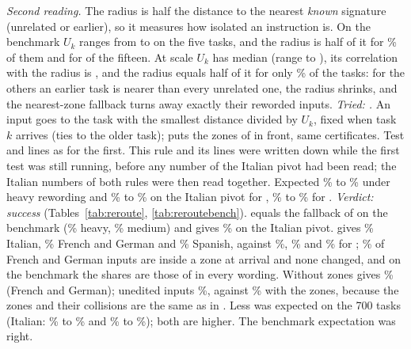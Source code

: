 \emph{Second reading.} The radius is half the distance to the nearest \emph{known} signature (unrelated or earlier), so it measures how isolated an instruction is. On the benchmark $U_k$ ranges from \RerouteBBenchFiveMin{} to \RerouteBBenchFiveMax{} on the five tasks, and the radius is half of it for \RerouteBBenchFiveShare{}\% of them and for \RerouteBBenchFifteenCount{} of the fifteen. At scale $U_k$ has median \RerouteBMedian{} (range \RerouteBMin{} to \RerouteBMax{}), its correlation with the radius is \RerouteBCorr{}, and the radius equals half of it for only \RerouteBShare{}\% of the \WidenTasksEval{} tasks: for the others an earlier task is nearer than every unrelated one, the radius shrinks, and the nearest-zone fallback turns away exactly their reworded inputs.
\emph{Tried: \scaled{}.} An input goes to the task with the smallest distance divided by $U_k$, fixed when task $k$ arrives (ties to the older task); \certscaled{} puts the zones of \cert{} in front, same certificates. Test and lines as for the first. This rule and its lines were written down while the first test was still running, before any number of the Italian pivot had been read; the Italian numbers of both rules were then read together. Expected \RerouteExpectBgHeavyLow{}\% to \RerouteExpectBgHeavyHigh{}\% under heavy rewording and \RerouteExpectBgItLow{}\% to \RerouteExpectBgItHigh{}\% on the Italian pivot for \scaled{}, \RerouteExpectCfItLow{}\% to \RerouteExpectCfItHigh{}\% for \certscaled{}.
\emph{Verdict: success} (Tables~\ref{tab:reroute}, \ref{tab:reroutebench}). \scaled{} equals the fallback of \cert{} on the benchmark (\RerouteBgHeavyFive{}\% heavy, \RerouteBgMediumFive{}\% medium) and gives \RerouteBgItOwn{}\% on the Italian pivot. \certscaled{} gives \RerouteCertFourItOwn{}\% Italian, \RerouteCertFourOwnEnd{}\% French and German and \RerouteCertFourEsOwn{}\% Spanish, against \RerouteCertItOwn{}\%, \RerouteCertOwnEnd{}\% and \RerouteCertEsOwn{}\% for \cert{}; \RerouteCertFourInZone{}\% of French and German inputs are inside a zone at arrival and none changed, and on the benchmark the shares are those of \cert{} in every wording. Without zones \scaled{} gives \RerouteBgOwnEnd{}\% (French and German); unedited inputs \RerouteBgUnOwn{}\%, against \RerouteCertFourUnOwn{}\% with the zones, because the zones and their collisions are the same as in \cert{}. Less was expected on the 700 tasks (Italian: \RerouteExpectBgItLow{}\% to \RerouteExpectBgItHigh{}\% and \RerouteExpectCfItLow{}\% to \RerouteExpectCfItHigh{}\%); both are higher. The benchmark expectation was right.
